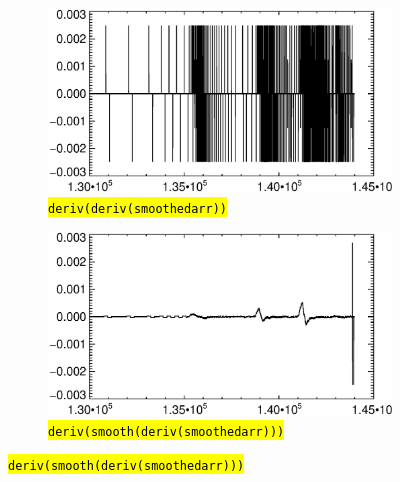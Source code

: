 \documentclass[10pt]{scrartcl}
\begin{document}
\begin{figure}[!h]
    \begin{center}
    \begin{subfigure}[b]{.49\textwidth}
        \centering
        \includegraphics[width=1.\textwidth]{../plots_tables_images/firstsmoothonly.eps}
        \caption{\hl{\texttt{deriv(deriv(smoothedarr))}}}
    \end{subfigure}
    \begin{subfigure}[b]{.49\textwidth}
        \centering
        \includegraphics[width=1.\textwidth]{../plots_tables_images/nowrap.eps}
        \caption{\hl{\texttt{deriv(smooth(deriv(smoothedarr)))}}}
    \end{subfigure}


\end{center}
\end{figure}
\end{document}

